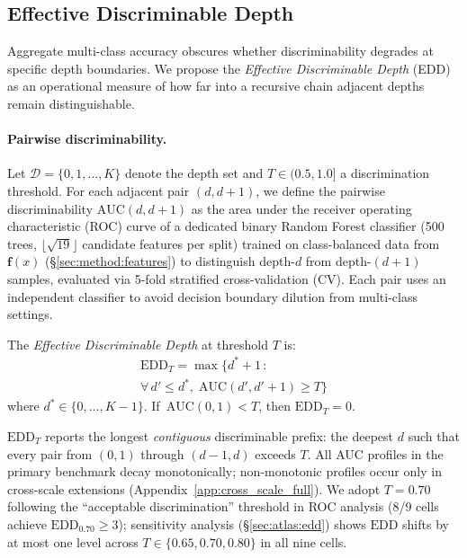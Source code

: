 \subsection{Effective Discriminable Depth}
\label{sec:method:edd}

Aggregate multi-class accuracy obscures whether discriminability degrades at specific depth boundaries.
We propose the \emph{Effective Discriminable Depth} (EDD) as an operational measure of how far into a recursive chain adjacent depths remain distinguishable.

\paragraph{Pairwise discriminability.}
Let $\mathcal{D} = \{0, 1, \dots, K\}$ denote the depth set and $T \in (0.5, 1.0]$ a discrimination threshold.
For each adjacent pair $(d, d{+}1)$, we define the pairwise discriminability $\mathrm{AUC}(d, d{+}1)$ as the area under the receiver operating characteristic (ROC) curve of a dedicated binary Random Forest classifier (500 trees, $\lfloor\sqrt{19}\rfloor$ candidate features per split) trained on class-balanced data from $\mathbf{f}(x)$ (\S\ref{sec:method:features}) to distinguish depth-$d$ from depth-$(d{+}1)$ samples, evaluated via 5-fold stratified cross-validation (CV).
Each pair uses an independent classifier to avoid decision boundary dilution from multi-class settings.

\begin{definition}
\label{def:edd}
The \emph{Effective Discriminable Depth} at threshold $T$ is:
\begin{multline}
\mathrm{EDD}_T = \max \bigl\{ d^*{+}1 \,:\, \\
\forall\, d' \leq d^*,\; \mathrm{AUC}(d', d'{+}1) \geq T \bigr\}
\label{eq:edd}
\end{multline}
where $d^* \in \{0, \dots, K{-}1\}$. If\, $\mathrm{AUC}(0,1) < T$, then $\mathrm{EDD}_T = 0$.
\end{definition}

$\mathrm{EDD}_T$ reports the longest \emph{contiguous} discriminable prefix: the deepest $d$ such that every pair from $(0,1)$ through $(d{-}1, d)$ exceeds $T$.
All AUC profiles in the primary benchmark decay monotonically; non-monotonic profiles occur only in cross-scale extensions (Appendix~\ref{app:cross_scale_full}).
We adopt $T{=}0.70$ following the ``acceptable discrimination'' threshold in ROC analysis \cite{hosmer2000} (8/9 cells achieve $\mathrm{EDD}_{0.70} \geq 3$); sensitivity analysis (\S\ref{sec:atlas:edd}) shows $\mathrm{EDD}$ shifts by at most one level across $T \in \{0.65, 0.70, 0.80\}$ in all nine cells.


